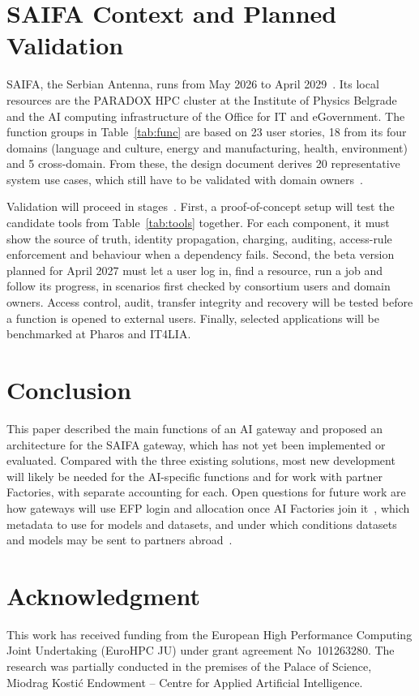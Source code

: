 \documentclass[conference,a4paper]{IEEEtran}
\newif\ifizmene
\DeclareRobustCommand{\chg}[1]{#1}
\DeclareRobustCommand{\roz}[1]{#1}
\DeclareRobustCommand{\nov}[1]{#1}
\DeclareRobustCommand{\tri}[1]{#1}
\DeclareRobustCommand{\fin}[1]{#1}
\DeclareRobustCommand{\pet}[1]{\ifizmene{\color{finalna}#1}\else#1\fi}
\begin{document}
\section{\nov{SAIFA Context and Planned Validation}}
\label{sec:saifa}

SAIFA, \chg{the Serbian Antenna, runs} from May 2026 to April 2029~\cite{cordis_saifa}. Its local resources are the PARADOX HPC cluster at the Institute of Physics Belgrade and the AI \roz{computing infrastructure of the Office for IT and eGovernment}. \roz{The function groups in Table~\ref{tab:func}} \nov{are based on} \roz{23 user stories, 18 from its four domains (language and culture, energy and manufacturing, health, environment) and 5 cross-domain.} \nov{From these, the design \tri{document} derives 20 representative system use cases, which still have to be validated with domain owners}~\cite{saifa_d31}.

\fin{Validation will proceed in stages}~\cite{saifa_d31}. \nov{First, a} proof-of-concept setup \nov{will} test the candidate tools \nov{from Table~\ref{tab:tools}} together\fin{. For each component, it must show the source of truth, identity propagation, charging, auditing, access-rule enforcement and behaviour when a dependency fails}. \nov{Second, the beta version planned for April 2027 must let a user log in, find a resource, run a job and follow its progress}\fin{, in scenarios first checked by consortium users and domain owners. Access control, audit, transfer integrity and recovery will be tested before a function is opened to external users. Finally, selected applications will be benchmarked at Pharos and IT4LIA.}

\section{Conclusion}

\nov{This paper described the main functions of an AI gateway and proposed an architecture for the SAIFA gateway, which has not yet been implemented or evaluated. Compared with the three existing solutions, most new development will likely be needed for the AI-specific functions and for work with partner Factories, with separate accounting for each.} \chg{Open questions} \roz{for future work} \chg{are how gateways will use EFP login and allocation} \tri{once AI Factories join it~\cite{eurohpc_efp},} \chg{which metadata to use for models and datasets, and} \tri{under which conditions datasets and models may be sent to partners abroad~\cite{saifa_d31}.}

\section*{\pet{Acknowledgment}}

\pet{This work has received funding from the European High Performance Computing Joint Undertaking (EuroHPC JU) under grant agreement No~101263280. The research was partially conducted in the premises of the Palace of Science, Miodrag Kosti\'c Endowment -- Centre for Applied Artificial Intelligence.}



\end{document}
